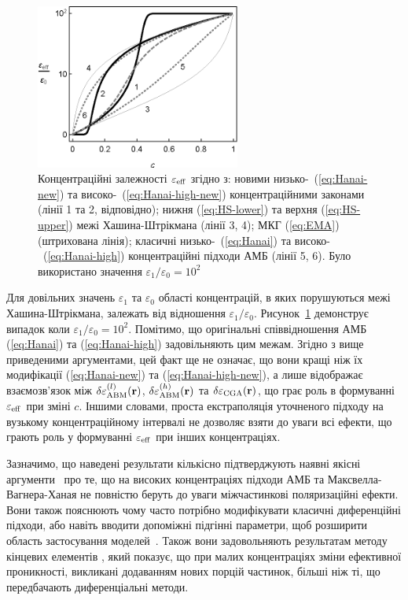 \documentclass[14pt,twoside]{vakthesis}
\begin{document}
\begin{figure}[!b]
	\centering
	\includegraphics[width=0.6\textwidth]{HSbounds.eps}
	\caption{\label{fig:HS-bounds-check}
		Концентраційні залежності $\varepsilon_{\rm eff}$ згідно
		з: новими низько-~(\ref{eq:Hanai-new}) та високо-~(\ref{eq:Hanai-high-new}) концентраційними законами
		(лінії 1 та 2, відповідно); нижня (\ref{eq:HS-lower})
		та верхня (\ref{eq:HS-upper}) межі Хашина-Штрікмана
		(лінії 3, 4); МКГ (\ref{eq:EMA}) (штрихована лінія);
		класичні низько-~(\ref{eq:Hanai}) та високо-~(\ref{eq:Hanai-high})
		концентраційні підходи АМБ (лінії 5, 6). Було використано значення $\varepsilon_1/\varepsilon_0 = 10^2$}
\end{figure}

Для довільних значень $\varepsilon_1$ та $ \varepsilon_0$ області концентрацій, в яких порушуються межі Хашина-Штрікмана, залежать від відношення $\varepsilon_1/\varepsilon_0$. Рисунок~\ref{fig:HS-bounds-check} демонструє випадок коли $\varepsilon_1/\varepsilon_0 = 10^2$. Помітимо, що оригінальні співвідношення АМБ (\ref{eq:Hanai}) та (\ref{eq:Hanai-high}) задовільняють цим межам. Згідно з вище приведеними аргументами, цей факт ще не означає, що вони кращі ніж їх модифікації (\ref{eq:Hanai-new}) та (\ref{eq:Hanai-high-new}), а лише відображає взаємозв'язок між $ \delta{\varepsilon}_{\rm ABM}^{(l)} ({\bf r})$, $\delta{\varepsilon}_{\rm ABM}^{(h)} ({\bf r})$ та $\delta{\varepsilon}_{\rm CGA} ({\bf r})$, що грає роль в формуванні $\varepsilon_{\rm eff}$ при зміні $c$. Іншими словами, проста екстраполяція уточненого підходу на вузькому концентраційному інтервалі не дозволяє взяти до уваги всі ефекти, що грають роль у формуванні $\varepsilon_{\rm eff}$ при інших концентраціях.

Зазначимо, що наведені результати кількісно підтверджують наявні якісні аргументи~\cite{Chelidze, Chelidze1999} про те, що на високих концентраціях підходи АМБ та Максвелла-Вагнера-Ханая не повністю беруть до уваги міжчастинкові поляризаційні ефекти. Вони також пояснюють чому часто потрібно модифікувати класичні диференційні підходи, або навіть вводити допоміжні підгінні параметри, щоб розширити область застосування моделей~\cite{Becher1987, Sihvola2007}. Також вони задовольняють результатам методу кінцевих елементів \cite{Mejdoubi2007}, який показує, що при малих концентраціях зміни ефективної проникності, викликані додаванням нових порцій частинок, більші ніж ті, що передбачають диференціальні методи.
\end{document}

